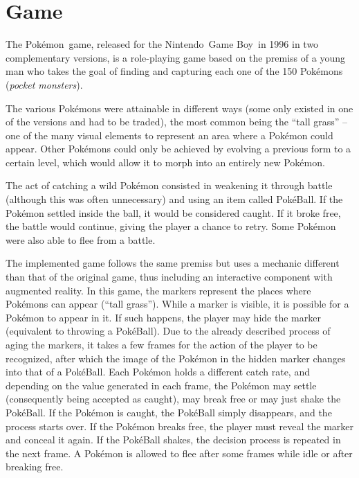 \section{Game}
\label{sec:game}

The Pokémon\textregistered\ game, released for the Nintendo\textregistered\ Game Boy\textregistered\ in 1996 in two complementary versions, is a role-playing game based on the premiss of a young man who takes the goal of finding and capturing each one of the 150 Pokémons (\textit{pocket monsters}).

The various Pokémons were attainable in different ways (some only existed in one of the versions and had to be traded), the most common being the ``tall grass'' -- one of the many visual elements to represent an area where a Pokémon could appear. Other Pokémons could only be achieved by evolving a previous form to a certain level, which would allow it to morph into an entirely new Pokémon.

The act of catching a wild Pokémon consisted in weakening it through battle (although this was often unnecessary) and using an item called PokéBall. If the Pokémon settled inside the ball, it would be considered caught. If it broke free, the battle would continue, giving the player a chance to retry. Some Pokémon were also able to flee from a battle.

The implemented game follows the same premiss but uses a mechanic different than that of the original game, thus including an interactive component with augmented reality. In this game, the markers represent the places where Pokémons can appear (``tall grass''). While a marker is visible, it is possible for a Pokémon to appear in it. If such happens, the player may hide the marker (equivalent to throwing a PokéBall). Due to the already described process of aging the markers, it takes a few frames for the action of the player to be recognized, after which the image of the Pokémon in the hidden marker changes into that of a PokéBall. Each Pokémon holds a different catch rate, and depending on the value generated in each frame, the Pokémon may settle (consequently being accepted as caught), may break free or may just shake the PokéBall. If the Pokémon is caught, the PokéBall simply disappears, and the process starts over. If the Pokémon breaks free, the player must reveal the marker and conceal it again. If the PokéBall shakes, the decision process is repeated in the next frame. A Pokémon is allowed to flee after some frames while idle or after breaking free.

